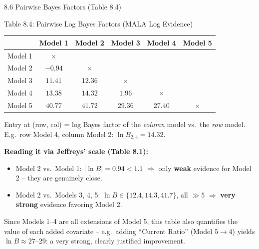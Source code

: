 \documentclass[aspectratio=169,10pt]{beamer}
\begin{document}
\begin{frame}[allowframebreaks]{8.6 Pairwise Bayes Factors (Table 8.4)}

\begin{block}{Table 8.4: Pairwise Log Bayes Factors (MALA Log Evidence)}
\centering\scriptsize
\begin{tabular}{lccccc}
\toprule
 & Model 1 & Model 2 & Model 3 & Model 4 & Model 5\\
\midrule
Model 1 & $\times$ & & & & \\
Model 2 & $-0.94$ & $\times$ & & & \\
Model 3 & $11.41$ & $12.36$ & $\times$ & & \\
Model 4 & $13.38$ & $14.32$ & $1.96$ & $\times$ & \\
Model 5 & $40.77$ & $41.72$ & $29.36$ & $27.40$ & $\times$\\
\bottomrule
\end{tabular}
\end{block}
Entry at (row, col) = log Bayes factor of the \emph{column} model vs.\ the \emph{row} model. E.g.\ row Model 4, column Model 2: $\ln B_{2,4} = 14.32$.

\textbf{Reading it via Jeffreys' scale (Table 8.1):}
\begin{itemize}
  \item Model 2 vs.\ Model 1: $|\ln B| = 0.94 < 1.1$ $\Rightarrow$ only \textbf{weak} evidence for Model 2 -- they are genuinely close.
  \item Model 2 vs.\ Models 3, 4, 5: $\ln B \in \{12.4, 14.3, 41.7\}$, all $\gg 5$ $\Rightarrow$ \textbf{very strong} evidence favoring Model 2.
\end{itemize}
Since Models 1--4 are all extensions of Model 5, this table also quantifies the value of each added covariate -- e.g.\ adding ``Current Ratio'' (Model $5\to4$) yields $\ln B \approx 27$--$29$: a very strong, clearly justified improvement.

\end{frame}
\end{document}
